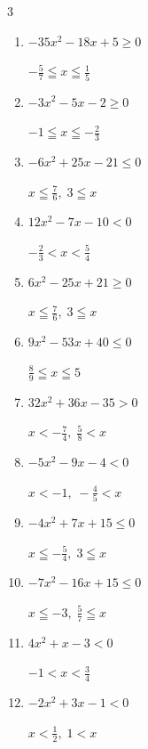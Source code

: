 \begin{multicols}{3}
\begin{enumerate}
\columnbreak %

  \item $-35x^{2}-18x+5\geq 0$

        $\displaystyle -\frac{5}{7} \leqq x \leqq \frac{1}{5}$

  \item $-3x^{2}-5x-2\geq 0$

        $\displaystyle -1 \leqq x \leqq -\frac{2}{3}$

  \item $-6x^{2}+25x-21\leq 0$

        $\displaystyle x \leqq \frac{7}{6} , \; 3 \leqq x$

  \item $12x^{2}-7x-10<0$

        $\displaystyle -\frac{2}{3} < x < \frac{5}{4}$

  \item $6x^{2}-25x+21\geq 0$

        $\displaystyle x \leqq \frac{7}{6} , \; 3 \leqq x$

  \item $9x^{2}-53x+40\leq 0$

        $\displaystyle \frac{8}{9} \leqq x \leqq 5$

  \item $32x^{2}+36x-35>0$

        $\displaystyle x < -\frac{7}{4} , \; \frac{5}{8} < x$

  \item $-5x^{2}-9x-4<0$

        $\displaystyle x < -1 , \; -\frac{4}{5} < x$

  \item $-4x^{2}+7x+15\leq 0$

        $\displaystyle x \leqq -\frac{5}{4} , \; 3 \leqq x$

  \item $-7x^{2}-16x+15\leq 0$

        $\displaystyle x \leqq -3 , \; \frac{5}{7} \leqq x$

\columnbreak %

\resetques

  \item $4x^{2}+x-3<0$

        $\displaystyle -1 < x < \frac{3}{4}$

  \item $-2x^{2}+3x-1<0$

        $\displaystyle x < \frac{1}{2} , \; 1 < x$


\end{enumerate}
\end{multicols}

